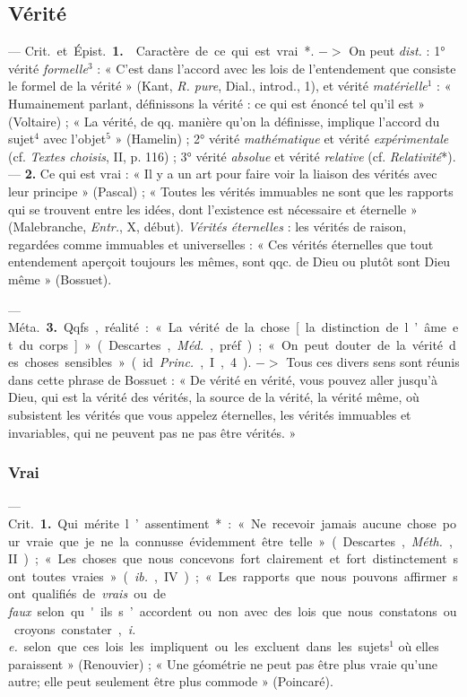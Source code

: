 \subsection{Vérité}
 — \si{Crit.} et \si{Épist.} {\bf 1.}  Caractère de
ce qui est vrai*. $->$ On peut {\it dist.} : 1° vérité {\it formelle}$^3$ : «
C’est dans l’accord avec les lois de l’entendement que consiste le formel de
la vérité » (Kant, {\it R. pure}, Dial., introd., 1), et vérité {\it
matérielle}$^1$ : « Humainement parlant, définissons la vérité : ce qui est
énoncé tel qu'il est » (Voltaire) ; « La vérité, de qq. manière qu’on la
définisse, implique l'accord du sujet$^4$ avec l’objet$^5$ » (Hamelin) ; 2°
vérité {\it mathématique} et vérité {\it expérimentale} (cf. {\it Textes
choisis}, II, p. 116) ; 3° vérité {\it absolue} et vérité {\it relative} (cf.
{\it Relativité}*). —  {\bf 2.}  Ce qui est vrai : « Il y a un
art pour faire voir la liaison des vérités avec leur principe » (Pascal) ; «
Toutes les vérités immuables ne sont que les rapports qui se trouvent entre
les idées, dont l'existence est nécessaire et éternelle » (Malebranche,
{\it Entr.}, X, début). {\it Vérités éternelles} : les vérités de raison,
regardées comme immuables et universelles : « Ces vérités éternelles que tout
entendement aperçoit toujours les mêmes, sont qqc. de Dieu ou plutôt sont
Dieu même » (Bossuet).

— \si{Méta.}  {\bf 3.} Qqfs., réalité : « La vérité de la chose [ la distinction de
l’âme et du corps ] » (Descartes, \si{{\it Méd.}}, préf.) ; « On peut douter
de la vérité des choses sensibles » (id. {\it Princ.}, I, 4). $->$ Tous ces
divers sens sont réunis dans cette phrase de Bossuet : « De vérité en vérité,
vous pouvez aller jusqu'à Dieu, qui est la vérité des vérités, la source de
la vérité, la vérité même, où subsistent les vérités que vous appelez
éternelles, les vérités immuables et invariables, qui ne peuvent pas ne pas
être vérités. »

\subsubsection{Vrai}
 — \si{Crit.} {\bf 1.} Qui mérite l’assentiment* : « Ne recevoir
jamais aucune chose pour vraie que je ne la connusse évidemment être telle
» (Descartes, {\it Méth.}, II) ; « Les choses que nous concevons fort
clairement et fort distinctement sont toutes vraies » ({\it ib.}, IV) ; « Les
rapports que nous pouvons affirmer sont qualifiés de {\it vrais} ou de {\it
faux} selon qu'ils s’accordent ou non avec des lois que nous constatons ou
croyons constater, {\it i. e.} selon que ces lois les impliquent ou les
excluent dans les sujets$^1$ où elles paraissent » (Renouvier) ; « Une
géométrie ne peut pas être plus vraie qu’une autre; elle peut seulement être
plus commode » (Poincaré).

